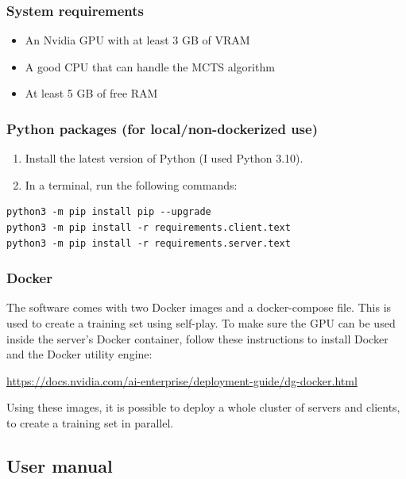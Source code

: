 \documentclass{article}
\begin{document}
\subsubsection{System requirements}

\begin{itemize}
	\item An Nvidia GPU with at least 3 GB of VRAM
	\item A good CPU that can handle the MCTS algorithm
	\item At least 5 GB of free RAM
\end{itemize}

\subsubsection{Python packages (for local/non-dockerized use)}

\begin{enumerate}
	\item Install the latest version of Python (I used Python 3.10). 
	\item In a terminal, run the following commands:
\end{enumerate}

\begin{verbatim}
python3 -m pip install pip --upgrade
python3 -m pip install -r requirements.client.text
python3 -m pip install -r requirements.server.text
\end{verbatim}

\subsubsection{Docker}

The software comes with two Docker images and a docker-compose file.
This is used to create a training set using self-play. 
To make sure the GPU can be used inside the server's Docker container,
follow these instructions to install Docker and the Docker utility engine:

\url{https://docs.nvidia.com/ai-enterprise/deployment-guide/dg-docker.html}

Using these images, it is possible to deploy a whole cluster of servers and clients,
to create a training set in parallel.


\newpage
\subsection{User manual}
\end{document}
